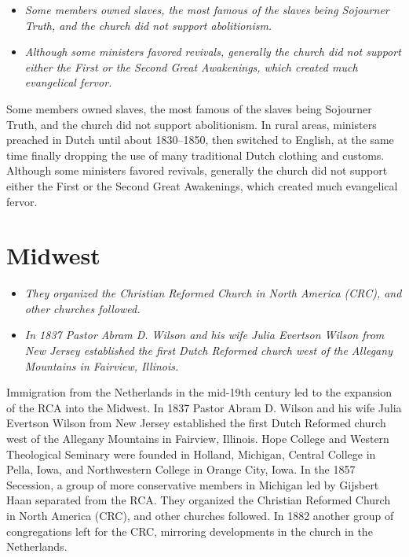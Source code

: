 \begin{itemize}
\item
  \emph{Some members owned slaves, the most famous of the slaves being
  Sojourner Truth, and the church did not support abolitionism.}
\item
  \emph{Although some ministers favored revivals, generally the church
  did not support either the First or the Second Great Awakenings, which
  created much evangelical fervor.}
\end{itemize}

Some members owned slaves, the most famous of the slaves being Sojourner
Truth, and the church did not support abolitionism. In rural areas,
ministers preached in Dutch until about 1830--1850, then switched to
English, at the same time finally dropping the use of many traditional
Dutch clothing and customs. Although some ministers favored revivals,
generally the church did not support either the First or the Second
Great Awakenings, which created much evangelical fervor.

\section{Midwest}\label{midwest}

\begin{itemize}
\item
  \emph{They organized the Christian Reformed Church in North America
  (CRC), and other churches followed.}
\item
  \emph{In 1837 Pastor Abram D. Wilson and his wife Julia Evertson
  Wilson from New Jersey established the first Dutch Reformed church
  west of the Allegany Mountains in Fairview, Illinois.}
\end{itemize}

Immigration from the Netherlands in the mid-19th century led to the
expansion of the RCA into the Midwest. In 1837 Pastor Abram D. Wilson
and his wife Julia Evertson Wilson from New Jersey established the first
Dutch Reformed church west of the Allegany Mountains in Fairview,
Illinois. Hope College and Western Theological Seminary were founded in
Holland, Michigan, Central College in Pella, Iowa, and Northwestern
College in Orange City, Iowa. In the 1857 Secession, a group of more
conservative members in Michigan led by Gijsbert Haan separated from the
RCA. They organized the Christian Reformed Church in North America
(CRC), and other churches followed. In 1882 another group of
congregations left for the CRC, mirroring developments in the church in
the Netherlands.


